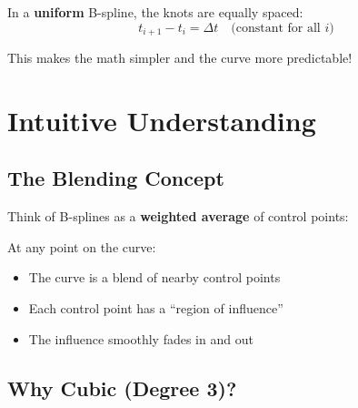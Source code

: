 \documentclass[12pt,a4paper]{article}
\begin{document}
In a \textbf{uniform} B-spline, the knots are equally spaced:
\begin{equation}
    t_{i+1} - t_i = \Delta t \quad \text{(constant for all } i\text{)}
\end{equation}

This makes the math simpler and the curve more predictable!

\section{Intuitive Understanding}

\subsection{The Blending Concept}

Think of B-splines as a \textbf{weighted average} of control points:

\begin{center}
\end{center}

At any point on the curve:
\begin{itemize}
    \item The curve is a blend of nearby control points
    \item Each control point has a ``region of influence''
    \item The influence smoothly fades in and out
\end{itemize}

\subsection{Why Cubic (Degree 3)?}
\end{document}
